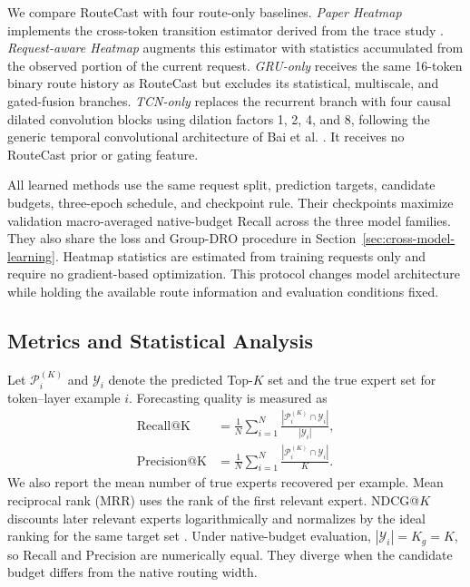 \documentclass[conference]{IEEEtran}
\begin{document}
We compare RouteCast with four route-only baselines. \emph{Paper Heatmap}
implements the cross-token transition estimator derived from the trace study
\cite{patterns}. \emph{Request-aware Heatmap} augments this estimator with
statistics accumulated from the observed portion of the current request.
\emph{GRU-only} receives the same 16-token binary route history as RouteCast
but excludes its statistical, multiscale, and gated-fusion branches.
\emph{TCN-only} replaces the recurrent branch with four causal dilated
convolution blocks using dilation factors 1, 2, 4, and 8, following the generic
temporal convolutional architecture of Bai et al. \cite{bai2018}. It receives no
RouteCast prior or gating feature.

All learned methods use the same request split, prediction targets, candidate
budgets, three-epoch schedule, and checkpoint rule. Their checkpoints maximize
validation macro-averaged native-budget Recall across the three model
families. They also share the loss and Group-DRO procedure in
Section~\ref{sec:cross-model-learning}. Heatmap statistics are estimated from training requests only
and require no gradient-based optimization. This protocol changes model
architecture while holding the available route information and evaluation
conditions fixed.

\subsection{Metrics and Statistical Analysis}

Let \(\mathcal{P}_i^{(K)}\) and \(\mathcal{Y}_i\) denote the predicted Top-\(K\)
set and the true expert set for token--layer example \(i\). Forecasting quality
is measured as
\begin{align}
\operatorname{Recall@K}
&=\frac{1}{N}\sum_{i=1}^{N}
\frac{|\mathcal{P}_i^{(K)}\cap\mathcal{Y}_i|}{|\mathcal{Y}_i|},\\
\operatorname{Precision@K}
&=\frac{1}{N}\sum_{i=1}^{N}
\frac{|\mathcal{P}_i^{(K)}\cap\mathcal{Y}_i|}{K}.
\label{eq:evaluation-metrics}
\end{align}
We also report the mean number of true experts recovered per example. Mean
reciprocal rank (MRR) uses the rank of the first relevant expert. NDCG@\(K\)
discounts later relevant experts logarithmically and normalizes by the ideal
ranking for the same target set \cite{jarvelin2002}. Under native-budget evaluation,
\(|\mathcal{Y}_i|=K_g=K\), so Recall and Precision are numerically equal.
They diverge when the candidate budget differs from the native routing width.
\end{document}
